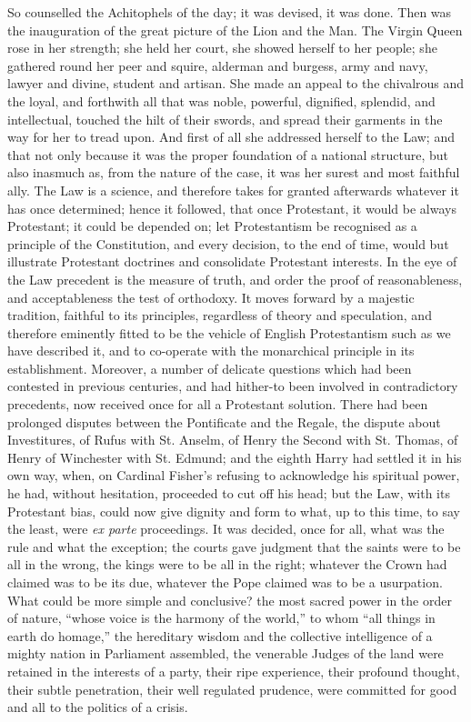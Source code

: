 So counselled the Achitophels of the day; it was
devised, it was done. Then was the inauguration of the
great picture of the Lion and the Man. The Virgin Queen
rose in her strength; she held her court, she showed
herself to her people; she gathered round her peer and
squire, alderman and burgess, army and navy, lawyer and
divine, student and artisan. She made an appeal to the
chivalrous and the loyal, and forthwith all that was
noble, powerful, dignified, splendid, and intellectual,
touched the hilt of their swords, and spread their
garments in the way for her to tread upon. And first of
all she addressed herself to the Law; and that not only
because it was the proper foundation of a national
structure, but also inasmuch as, from the nature of the
case, it was her surest and most faithful ally. The Law
is a science, and therefore takes for granted afterwards
whatever it has once determined; hence it followed, that
once Protestant, it would be always Protestant; it could
be depended on; let Protestantism be recognised as a
principle of the Constitution, and every decision, to the
end of time, would but illustrate Protestant doctrines
and consolidate Protestant interests. In the eye of the
Law precedent is the measure of truth, and order the
proof of reasonableness, and acceptableness the test of
orthodoxy. It moves forward by a majestic tradition,
faithful to its principles, regardless of theory and
speculation, and therefore eminently fitted to be the
vehicle of English Protestantism such as we have
described it, and to co-operate with the monarchical
principle in its establishment. Moreover, a number of
delicate questions which had been contested in previous
centuries, and had hither-to been involved in
contradictory precedents, now received once for all a
Protestant solution. There had been prolonged disputes
between the Pontificate and the Regale, the dispute about
Investitures, of Rufus with St. Anselm, of Henry the
Second with St. Thomas, of Henry of Winchester with St.
Edmund; and the eighth Harry had settled it in his own
way, when, on Cardinal Fisher's refusing to acknowledge
his spiritual power, he had, without hesitation,
proceeded to cut off his head; but the Law, with its
Protestant bias, could now give dignity and form to what,
up to this time, to say the least, were \emph{ex parte}
proceedings. It was decided, once for all, what was the
rule and what the exception; the courts gave judgment
that the saints were to be all in the wrong, the kings
were to be all in the right; whatever the Crown had
claimed was to be its due, whatever the Pope claimed was
to be a usurpation. What could be more simple and
conclusive? the most sacred power in the order of nature,
``whose voice is the harmony of the world,'' to
whom ``all things in earth do homage,'' the
hereditary wisdom and the collective intelligence of a
mighty nation in Parliament assembled, the venerable
Judges of the land were retained in the interests of a
party, their ripe experience, their profound thought,
their subtle penetration, their well regulated prudence,
were committed for good and all to the politics of a
crisis.

